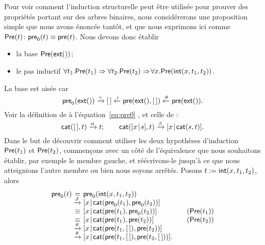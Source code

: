 Pour voir comment l'induction structurelle peut être utilisée pour
prouver des propriétés portant sur des arbres binaires, nous
considérerons une proposition simple que nous avons énoncée tantôt, et
que nous exprimons ici comme \(\textsf{Pre}({t}) \colon \textsf{pre}_0(t)
\equiv
\textsf{pre}(t)\).
Nous devons donc établir
\begin{itemize}

  \item la base \(\textsf{Pre}({\textsf{ext}()})\);

  \item le pas inductif \(\forall t_1.\textsf{Pre}({t_1}) \Rightarrow
    \forall t_2.\textsf{Pre}({t_2}) \Rightarrow \! \forall
    x.\textsf{Pre}({\textsf{int}(x,t_1,t_2)})\).

\end{itemize}
La base est aisée car
\begin{equation*}
  \textsf{pre}_0(\textsf{ext}())
  \xrightarrow{\smash{\gamma}} [\,] \xleftarrow{\smash{\iota}}
  \textsf{pre}(\textsf{ext}(),[\,]) \xleftarrow{\smash{\theta}}
  \textsf{pre}(\textsf{ext}()).
\end{equation*}
Voir la définition de  à
l'équation~\eqref{eq:pre0} , et celle de
:
\begin{equation*}
\textsf{cat}([\,],t) \xrightarrow{\smash{\alpha}} t;
\qquad
\textsf{cat}([{x}\!\mid\!{s}],t) \xrightarrow{\smash{\beta}}
[{x}\!\mid\!{\textsf{cat}(s,t)}].
\end{equation*}
Dans le but de découvrir comment utiliser les deux hypothèses
d'induction \(\textsf{Pre}({t_1})\) et
\(\textsf{Pre}({t_2})\), commençons avec un côté
de l'équivalence que nous souhaitons établir, par exemple le membre
gauche, et réécrivons-le jusqu'à ce que nous atteignions l'autre
membre ou bien nous soyons arrêtés. Posons \(t :=
\textsf{int}(x,t_1,t_2)\), alors
\begin{equation*}
\begin{array}{@{}r@{\;}c@{\;}l@{\qquad}r@{}}
\fun{pre}_0(t)
& = & \fun{pre}_0(\fun{int}(x,t_1,t_2))\\
& \xrightarrow{\smash{\delta}}
& \cons{x}{\fun{cat}(\fun{pre}_0(t_1), \fun{pre}_0(t_2))}\\
& \equiv & \cons{x}{\fun{cat}(\fun{pre}(t_1), \fun{pre}_0(t_2))}
& (\pred{Pre}{t_1})\\
& \equiv & \cons{x}{\fun{cat}(\fun{pre}(t_1), \fun{pre}(t_2))}
& (\pred{Pre}{t_2})\\
& \xrightarrow{\smash{\theta}}
& \cons{x}{\fun{cat}(\fun{pre}(t_1,\el), \fun{pre}(t_2))}\\
& \xrightarrow{\smash{\theta}}
& \cons{x}{\fun{cat}(\fun{pre}(t_1,\el), \fun{pre}(t_2,\el))}.
\end{array}
\end{equation*}
